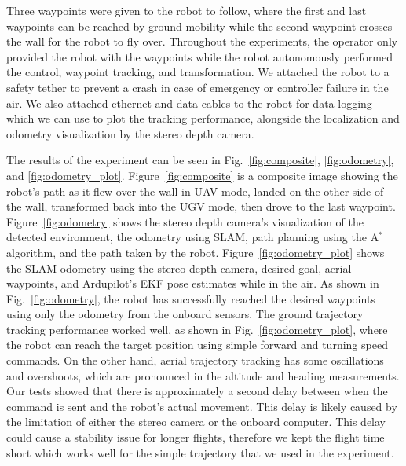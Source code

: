 \documentclass[letterpaper, 10 pt, conference]{ieeeconf}  %
\begin{document}
Three waypoints were given to the robot to follow, where the first and last waypoints can be reached by ground mobility while the second waypoint crosses the wall for the robot to fly over. Throughout the experiments, the operator only provided the robot with the waypoints while the robot autonomously performed the control, waypoint tracking, and transformation. We attached the robot to a safety tether to prevent a crash in case of emergency or controller failure in the air. We also attached ethernet and data cables to the robot for data logging which we can use to plot the tracking performance, alongside the localization and odometry visualization by the stereo depth camera.

The results of the experiment can be seen in Fig.~\ref{fig:composite}, \ref{fig:odometry}, and \ref{fig:odometry_plot}. Figure~\ref{fig:composite} is a composite image showing the robot's path as it flew over the wall in UAV mode, landed on the other side of the wall, transformed back into the UGV mode, then drove to the last waypoint. Figure~\ref{fig:odometry} shows the stereo depth camera's visualization of the detected environment, the odometry using SLAM, path planning using the A$^*$ algorithm, and the path taken by the robot. Figure~\ref{fig:odometry_plot} shows the SLAM odometry using the stereo depth camera, desired goal, aerial waypoints, and Ardupilot's EKF pose estimates while in the air. 
%
As shown in Fig.~\ref{fig:odometry}, the robot has successfully reached the desired waypoints using only the odometry from the onboard sensors. The ground trajectory tracking performance worked well, as shown in Fig.~\ref{fig:odometry_plot}, where the robot can reach the target position using simple forward and turning speed commands. On the other hand, aerial trajectory tracking has some oscillations and overshoots, which are pronounced in the altitude and heading measurements. Our tests showed that there is approximately a second delay between when the command is sent and the robot's actual movement.
This delay is likely caused by the limitation of either the stereo camera or the onboard computer. This delay could cause a stability issue for longer flights, therefore we kept the flight time short which works well for the simple trajectory that we used in the experiment. 
\end{document}
